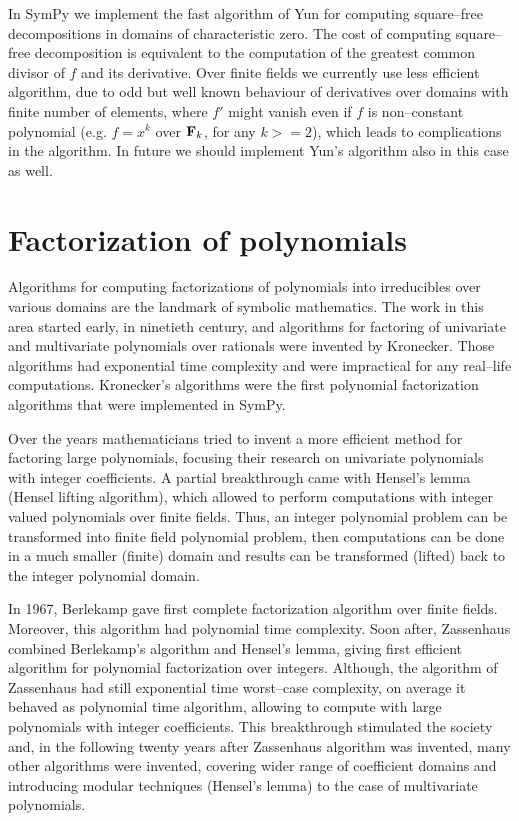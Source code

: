 In SymPy we implement the fast algorithm of Yun \cite{Yun1976squarefree} for computing square--free
decompositions in domains of characteristic zero. The cost of computing square--free decomposition
is equivalent to the computation of the greatest common divisor of $f$ and its derivative. Over
finite fields we currently use less efficient algorithm, due to odd but well known behaviour of
derivatives over domains with finite number of elements, where $f'$ might vanish even if $f$ is
non--constant polynomial (e.g. $f = x^k$ over $\mathbf{F}_k$, for any $k >= 2$), which leads to complications
in the algorithm. In future we should implement Yun's algorithm also in this case as well.


\section{Factorization of polynomials}

Algorithms for computing factorizations of polynomials into irreducibles over various domains
are the landmark of symbolic mathematics. The work in this area started early, in ninetieth
century, and algorithms for factoring of univariate and multivariate polynomials over rationals
were invented by Kronecker. Those algorithms had exponential time complexity and were impractical
for any real--life computations. Kronecker's algorithms were the first polynomial factorization
algorithms that were implemented in SymPy.

Over the years mathematicians tried to invent a more efficient method for factoring large polynomials,
focusing their research on univariate polynomials with integer coefficients. A partial breakthrough
came with Hensel's lemma (Hensel lifting algorithm), which allowed to perform computations with integer
valued polynomials over finite fields. Thus, an integer polynomial problem can be transformed into
finite field polynomial problem, then computations can be done in a much smaller (finite) domain and
results can be transformed (lifted) back to the integer polynomial domain.

In 1967, Berlekamp gave first complete factorization algorithm over finite fields. Moreover, this
algorithm had polynomial time complexity. Soon after, Zassenhaus combined Berlekamp's algorithm and
Hensel's lemma, giving first efficient algorithm for polynomial factorization over integers. Although,
the algorithm of Zassenhaus had still exponential time worst--case complexity, on average it behaved
as polynomial time algorithm, allowing to compute with large polynomials with integer coefficients.
This breakthrough stimulated the society and, in the following twenty years after Zassenhaus algorithm
was invented, many other algorithms were invented, covering wider range of coefficient domains and
introducing modular techniques (Hensel's lemma) to the case of multivariate polynomials.


